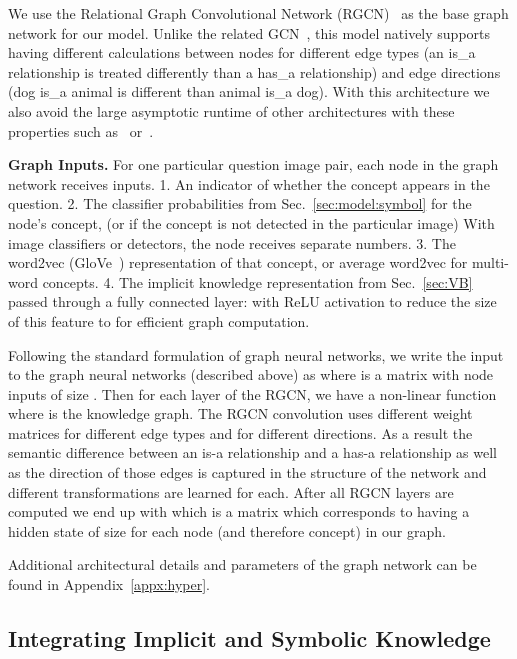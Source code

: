 \documentclass[final]{cvpr}
\providecommand{\myparagraph}[1]{\noindent\textbf{#1.}}
\providecommand{\sectionvspace}{\vspace{-0cm}}
\begin{document}
We use the Relational Graph Convolutional Network (RGCN)~\cite{schlichtkrull2018modeling} as the base graph network for our model. Unlike the related GCN~\cite{kipf2016semi}, this model natively supports having different calculations between nodes for different edge types (an is\_a relationship is treated differently than a has\_a relationship) and edge directions (dog is\_a animal is different than animal is\_a dog). With this architecture we also avoid the large asymptotic runtime of other architectures with these properties such as~\cite{Li16} or~\cite{velivckovic2017graph}.

\myparagraph{Graph Inputs} 
For one particular question image pair, each node in the graph network receives  inputs. 
1. An indicator  of whether the concept appears in the question.
2. The classifier probabilities from Sec.~\ref{sec:model:symbol} for the node's concept, (or  if the concept is not detected in the particular image) 
With  image classifiers or detectors, the node receives  separate numbers. 3. The  word2vec (GloVe~\cite{pennington2014glove}) representation of that concept, or average word2vec for multi-word concepts. 4. The implicit knowledge representation  from Sec.~\ref{sec:VB} passed through a fully connected layer:  with ReLU activation to reduce the size of this feature to  for efficient graph computation.

Following the standard formulation of graph neural networks, we write the input to the graph neural networks (described above) as  where  is a  matrix with  node inputs of size .
Then for each layer of the RGCN, we have a non-linear function  where  is the knowledge graph. The RGCN convolution uses different weight matrices for different edge types and for different directions. As a result the semantic difference between an is-a relationship and a has-a relationship as well as the direction of those edges is captured in the structure of the network and different transformations are learned for each. After all RGCN layers are computed we end up with  which is a  matrix which corresponds to having a hidden state of size  for each node (and therefore concept) in our graph.

Additional architectural details and parameters of the graph network can be found in Appendix~\ref{appx:hyper}.

\sectionvspace
\subsection{Integrating Implicit and Symbolic Knowledge}
\label{sec:model:integration}
\sectionvspace
\end{document}
